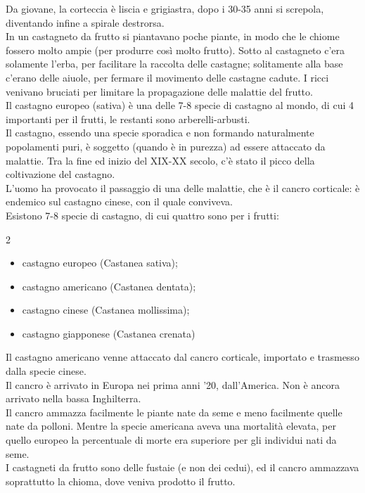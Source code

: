 Da giovane, la corteccia è liscia e grigiastra, dopo i 30-35 anni si screpola, diventando infine a spirale destrorsa.\\
In un castagneto da frutto si piantavano poche piante, in modo che le chiome fossero molto ampie (per produrre così molto frutto). Sotto al castagneto c'era solamente l'erba, per facilitare la raccolta delle castagne; solitamente alla base c'erano delle aiuole, per fermare il movimento delle castagne cadute. I ricci venivano bruciati per limitare la propagazione delle malattie del frutto.\\
Il castagno europeo (sativa) è una delle 7-8 specie di castagno al mondo, di cui 4 importanti per il frutti, le restanti sono arberelli-arbusti. \\
Il castagno, essendo una specie sporadica e non formando naturalmente popolamenti puri, è soggetto (quando è in purezza) ad essere attaccato da malattie. Tra la fine ed inizio del XIX-XX secolo, c'è stato il picco della coltivazione del castagno.\\
L'uomo ha provocato il passaggio di una delle malattie, che è il cancro corticale: è endemico sul castagno cinese, con il quale conviveva.\\
Esistono 7-8 specie di castagno, di cui quattro sono per i frutti:
\begin{multicols}{2}
\begin{itemize}[nosep]
    \item castagno europeo (Castanea sativa);
    \item castagno americano (Castanea dentata);
    \item castagno cinese (Castanea mollissima);
    \item castagno giapponese (Castanea crenata)
\end{itemize}
\end{multicols}
Il castagno americano venne attaccato dal cancro corticale, importato e trasmesso dalla specie cinese.\\
Il cancro è arrivato in Europa nei prima anni '20, dall'America. Non è ancora arrivato nella bassa Inghilterra.\\
Il cancro ammazza facilmente le piante nate da seme e meno facilmente quelle nate da polloni. Mentre la specie americana aveva una mortalità elevata, per quello europeo la percentuale di morte era superiore per gli individui nati da seme.\\
I castagneti da frutto sono delle fustaie (e non dei cedui), ed il cancro ammazzava soprattutto la chioma, dove veniva prodotto il frutto.\\
